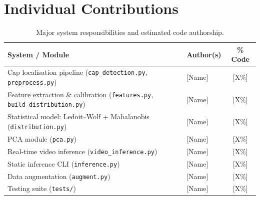 \section*{Individual Contributions}

\begin{table}[h]
\centering
\caption{Major system responsibilities and estimated code authorship.}
\label{tab:contrib}
\small
\begin{tabular}{p{4.5cm}p{3cm}c}
\hline
\textbf{System / Module} & \textbf{Author(s)} & \textbf{\% Code} \\
\hline
Cap localisation pipeline
(\texttt{cap\_detection.py}, \texttt{preprocess.py})
& [Name] & [X\%] \\
Feature extraction \& calibration
(\texttt{features.py}, \texttt{build\_distribution.py})
& [Name] & [X\%] \\
Statistical model: Ledoit--Wolf + Mahalanobis
(\texttt{distribution.py})
& [Name] & [X\%] \\
PCA module (\texttt{pca.py})
& [Name] & [X\%] \\
Real-time video inference
(\texttt{video\_inference.py})
& [Name] & [X\%] \\
Static inference CLI (\texttt{inference.py})
& [Name] & [X\%] \\
Data augmentation (\texttt{augment.py})
& [Name] & [X\%] \\
Testing suite (\texttt{tests/})
& [Name] & [X\%] \\
\hline
\end{tabular}
\end{table}
